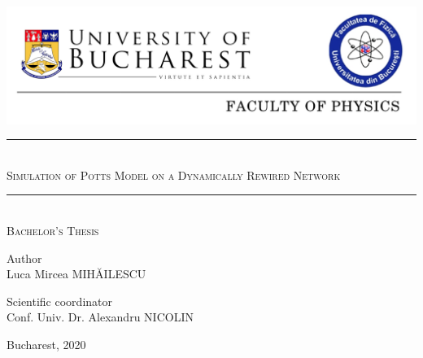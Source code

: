 \documentclass[12pt,openright,twoside]{book}
\newcommand{\HRule}{\rule{\linewidth}{0.4mm}}
\begin{document}
\begin{titlepage}
\begin{center}





\includegraphics[width=16cm]{./header.png}



\vspace{4cm}



    \HRule \\[0.3cm]


    {\Large \textsc {Simulation of Potts Model on a Dynamically Rewired Network}}\\


  \HRule \\[1.1cm]

  \textsc{\large Bachelor's Thesis}\\[4cm]

   \begin{flushleft} \large
    {Author} \\[0.1cm]
    Luca Mircea MIHĂILESCU
   \end{flushleft}

   \begin{flushright} \large
    {Scientific coordinator} \\[0.1cm]
    Conf. Univ. Dr. Alexandru NICOLIN
   \end{flushright}


  \vfill


 {\large Bucharest, 2020}

\end{center}

\end{titlepage}
\newpage
\vspace*{\fill}
\thispagestyle{empty}




\newpage
\thispagestyle{plain} 


\vspace*{36pt}
\end{document}
